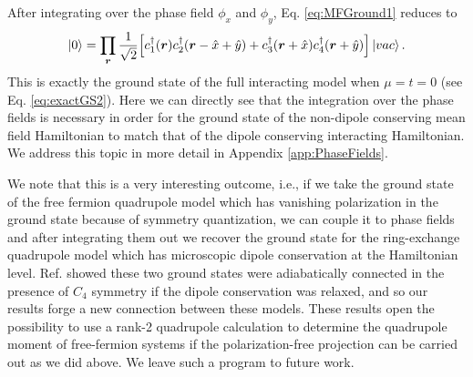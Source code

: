 \documentclass[prb,aps,twocolumn,groupaddress,floatfix]{revtex4-1}
\begin{document}
After integrating over the phase field $\phi_x$ and $\phi_y$, Eq. \ref{eq:MFGround1} reduces to
\begin{equation}
\ket{0} = \prod_{\bm{r}} \frac{1}{\sqrt{2}}\Big[ c^\dagger_1(\bm{r})c^\dagger_2(\bm{r}-\hat{x}+\hat{y}) + c^\dagger_3(\bm{r}+\hat{x}) c^\dagger_4(\bm{r}+\hat{y})\Big]\ket{vac}.\label{eq:IntGroundPi}
\end{equation} 
This is exactly the ground state of the full interacting model when $\mu=t= 0$ (see Eq. \ref{eq:exactGS2}). Here we can directly see that the integration over the phase fields is necessary in order for the ground state of the non-dipole conserving mean field Hamiltonian to match that of the dipole conserving interacting Hamiltonian. We address this topic in more detail in Appendix \ref{app:PhaseFields}. 

We note that this is a very interesting outcome, i.e., if we take the ground state of the free fermion quadrupole model which has vanishing polarization in the ground state because of symmetry quantization, we can couple it to phase fields and after integrating them out we recover the ground state for the ring-exchange quadrupole model which has microscopic dipole conservation at the Hamiltonian level. Ref.  showed these two ground states were adiabatically connected in the presence of $C_4$ symmetry if the dipole conservation was relaxed, and so our results forge a new connection between these models. These results open the possibility to use a rank-2 quadrupole calculation to determine the quadrupole moment of free-fermion systems if the polarization-free projection can be carried out as we did above. We leave such a program to future work. 
\end{document}
